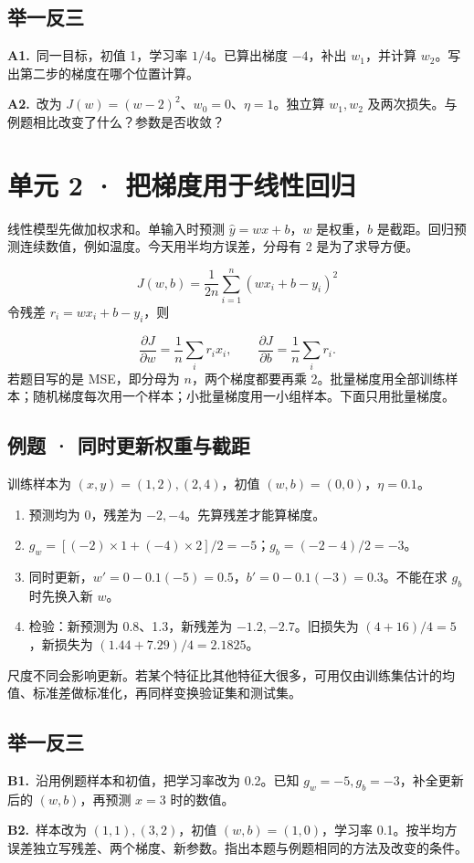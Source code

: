\documentclass[UTF8,a4paper,11pt]{ctexart}
\newcommand{\CompactQuestion}[2]{\par\noindent\textbf{#1.}\ #2\par\vspace{.8em}}
\begin{document}
\subsection{举一反三}
\CompactQuestion{A1}{同一目标，初值 1，学习率 $1/4$。已算出梯度 $-4$，补出 $w_1$，并计算 $w_2$。写出第二步的梯度在哪个位置计算。}
\CompactQuestion{A2}{改为 $J(w)=(w-2)^2$、$w_0=0$、$\eta=1$。独立算 $w_1,w_2$ 及两次损失。与例题相比改变了什么？参数是否收敛？}
\clearpage
\section{单元 2 · 把梯度用于线性回归}
线性模型先做加权求和。单输入时预测 $\hat y=wx+b$，$w$ 是权重，$b$ 是截距。回归预测连续数值，例如温度。今天用半均方误差，分母有 2 是为了求导方便。

\[J(w,b)=\frac{1}{2n}\sum_{i=1}^{n}(wx_i+b-y_i)^2\]
令残差 $r_i=wx_i+b-y_i$，则

\[\frac{\partial J}{\partial w}=\frac{1}{n}\sum_i r_ix_i,\qquad \frac{\partial J}{\partial b}=\frac{1}{n}\sum_i r_i.\]
若题目写的是 MSE，即分母为 $n$，两个梯度都要再乘 2。批量梯度用全部训练样本；随机梯度每次用一个样本；小批量梯度用一小组样本。下面只用批量梯度。

\subsection{例题 · 同时更新权重与截距}
训练样本为 $(x,y)=(1,2),(2,4)$，初值 $(w,b)=(0,0)$，$\eta=0.1$。

\begin{enumerate}
\item 预测均为 0，残差为 $-2,-4$。先算残差才能算梯度。
\item $g_w=[(-2)\times1+(-4)\times2]/2=-5$；$g_b=(-2-4)/2=-3$。
\item 同时更新，$w'=0-0.1(-5)=0.5$，$b'=0-0.1(-3)=0.3$。不能在求 $g_b$ 时先换入新 $w$。
\item 检验：新预测为 0.8、1.3，新残差为 $-1.2,-2.7$。旧损失为 $(4+16)/4=5$，新损失为 $(1.44+7.29)/4=2.1825$。
\end{enumerate}
尺度不同会影响更新。若某个特征比其他特征大很多，可用仅由训练集估计的均值、标准差做标准化，再同样变换验证集和测试集。

\subsection{举一反三}
\CompactQuestion{B1}{沿用例题样本和初值，把学习率改为 0.2。已知 $g_w=-5,g_b=-3$，补全更新后的 $(w,b)$，再预测 $x=3$ 时的数值。}
\CompactQuestion{B2}{样本改为 $(1,1),(3,2)$，初值 $(w,b)=(1,0)$，学习率 0.1。按半均方误差独立写残差、两个梯度、新参数。指出本题与例题相同的方法及改变的条件。}
\clearpage
\end{document}
